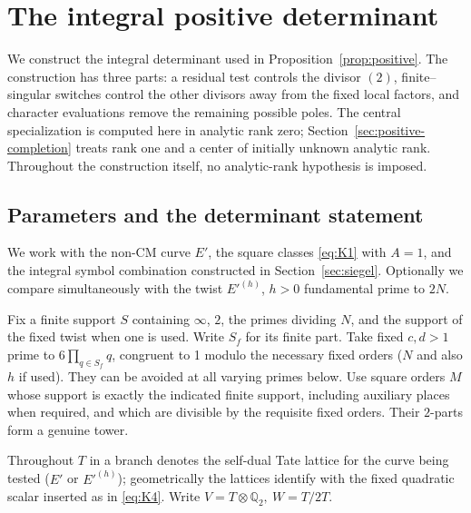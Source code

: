 \section{The integral positive determinant}\label{sec:positive-determinant}

We construct the integral determinant used in Proposition~\ref{prop:positive}.
The construction has three parts: a residual test controls the divisor \((2)\),
finite--singular switches control the other divisors away from the fixed local
factors, and character evaluations remove the remaining possible poles.
The central specialization is computed here in analytic rank zero;
Section~\ref{sec:positive-completion} treats rank one and a center of initially
unknown analytic rank. Throughout the construction itself, no analytic-rank
hypothesis is imposed.

\subsection{Parameters and the determinant statement}

We work with the non-CM curve \(E'\), the square classes \eqref{eq:K1} with \(A=1\), and the integral symbol combination constructed in Section~\ref{sec:siegel}. Optionally we compare simultaneously with the twist \(E'^{(h)}\), \(h>0\) fundamental prime to \(2N\). 

Fix a finite support \(S\) containing \(\infty\), \(2\), the primes dividing \(N\), and the support of the fixed twist when one is used. Write \(S_f\) for its finite part. Take fixed \(c,d>1\) prime to \(6\prod_{q\in S_f}q\), congruent to 1 modulo the necessary fixed orders (\(N\) and also \(h\) if used). They can be avoided at all varying primes below. Use square orders \(M\) whose support is exactly the indicated finite support, including auxiliary places when required, and which are divisible by the requisite fixed orders. Their \(2\)-parts form a genuine tower. 

Throughout \(T\) in a branch denotes the self-dual Tate lattice for the curve being tested (\(E'\) or \(E'^{(h)}\)); geometrically the lattices identify with the fixed quadratic scalar inserted as in \eqref{eq:K4}. Write \(V=T\otimes\mathbb Q_2,\ W=T/2T\).

